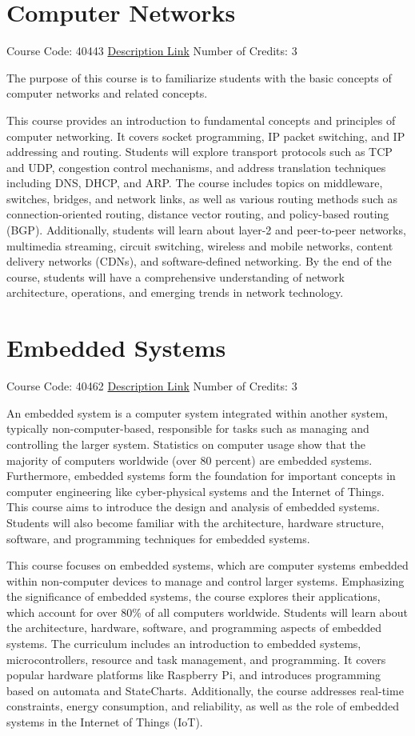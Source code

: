 \section{Computer Networks}
Course Code: 40443 \qquad \quad \href{https://docs.ce.sharif.edu/course/40443}{Description Link}
\qquad \quad Number of Credits: 3

The purpose of this course is to familiarize students with the basic concepts of computer networks and related concepts.


This course provides an introduction to fundamental concepts and principles of computer networking. It covers socket programming, IP packet switching, and IP addressing and routing. Students will explore transport protocols such as TCP and UDP, congestion control mechanisms, and address translation techniques including DNS, DHCP, and ARP. The course includes topics on middleware, switches, bridges, and network links, as well as various routing methods such as connection-oriented routing, distance vector routing, and policy-based routing (BGP). Additionally, students will learn about layer-2 and peer-to-peer networks, multimedia streaming, circuit switching, wireless and mobile networks, content delivery networks (CDNs), and software-defined networking. By the end of the course, students will have a comprehensive understanding of network architecture, operations, and emerging trends in network technology.

\section{Embedded Systems}
Course Code: 40462 \qquad \quad \href{https://docs.ce.sharif.edu/course/40462}{Description Link}
\qquad \quad Number of Credits: 3

An embedded system is a computer system integrated within another system, typically non-computer-based, responsible for tasks such as managing and controlling the larger system. Statistics on computer usage show that the majority of computers worldwide (over 80 percent) are embedded systems. Furthermore, embedded systems form the foundation for important concepts in computer engineering like cyber-physical systems and the Internet of Things. This course aims to introduce the design and analysis of embedded systems. Students will also become familiar with the architecture, hardware structure, software, and programming techniques for embedded systems.


This course focuses on embedded systems, which are computer systems embedded within non-computer devices to manage and control larger systems. Emphasizing the significance of embedded systems, the course explores their applications, which account for over 80\% of all computers worldwide. Students will learn about the architecture, hardware, software, and programming aspects of embedded systems. The curriculum includes an introduction to embedded systems, microcontrollers, resource and task management, and programming. It covers popular hardware platforms like Raspberry Pi, and introduces programming based on automata and StateCharts. Additionally, the course addresses real-time constraints, energy consumption, and reliability, as well as the role of embedded systems in the Internet of Things (IoT).

